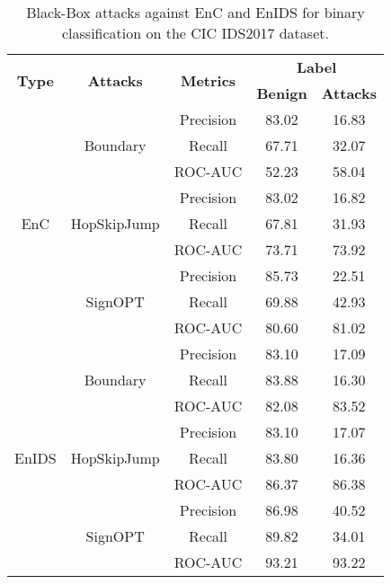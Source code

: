 \documentclass[conference]{IEEEtran}
\begin{document}
	\begin{table}[H]
		\caption{Black-Box attacks against EnC and EnIDS for binary classification on the CIC IDS2017 dataset.}
		\small
		\setlength{\tabcolsep}{0.1pt}
		\centering
		\label{tab:cic_bin_black}
		
		\begin{tabular}{|c|c|c|c|c|}
			\hline
			\multirow{2}{*}{\textbf{Type}} & \multirow{2}{*}{\textbf{Attacks}} & \multirow{2}{*}{\textbf{Metrics}} &  \multicolumn{2}{c|}{\textbf{Label}} \\
			\cline{4-5}
			&  &  & \textbf{Benign} & \textbf{Attacks} \\
			\hline
			\multirow{9}{*}{EnC} & 	\multirow{3}{*}{Boundary} & Precision & 83.02 & 16.83 \\
			
			&  & Recall & 67.71 & 32.07 \\
			
			&  & ROC-AUC & 52.23 & 58.04 \\
			\cline{2-5}
			& \multirow{3}{*}{HopSkipJump} & Precision & 83.02 & 16.82 \\
			
			&  & Recall & 67.81 & 31.93 \\
			
			&  & ROC-AUC & 73.71 & 73.92 \\
			\cline{2-5}
			& \multirow{3}{*}{SignOPT} & Precision & 85.73 & 22.51 \\
			
			&  & Recall & 69.88 & 42.93 \\
			
			&  & ROC-AUC & 80.60 & 81.02 \\
			\hline
			\multirow{9}{*}{EnIDS} & \multirow{3}{*}{Boundary} & Precision & \cellcolor{yellow!50}83.10 & 17.09 \\
			
			&  & Recall & \cellcolor{yellow!50}83.88 & 16.30 \\
			
			&  & ROC-AUC & \cellcolor{yellow!50}82.08 & \cellcolor{yellow!50}83.52 \\
			\cline{2-5}
			& \multirow{3}{*}{HopSkipJump} & Precision & \cellcolor{yellow!50}83.10 & 17.07 \\
			
			&  & Recall & \cellcolor{yellow!50}83.80 & 16.36 \\
			
			&  & ROC-AUC & \cellcolor{yellow!50}86.37 & \cellcolor{yellow!50}86.38 \\
			\cline{2-5}
			& \multirow{3}{*}{SignOPT} & Precision & \cellcolor{yellow!50}86.98 & 40.52 \\
			
			&  & Recall & \cellcolor{yellow!50}89.82 & 34.01 \\
			
			&  & ROC-AUC & \cellcolor{yellow!50}93.21 & \cellcolor{yellow!50}93.22 \\
			\hline
		\end{tabular}			
	\end{table}
	
\end{document}
